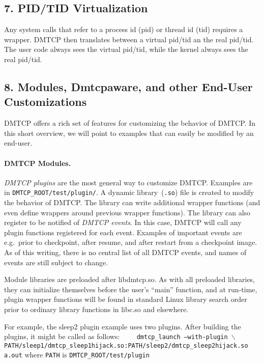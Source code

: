 \documentclass{article}
\begin{document}
\subsection*{7. PID/TID Virtualization}

Any system calls that refer to a process id (pid) or thread id (tid) requires
a wrapper.  DMTCP then translates between a virtual pid/tid an the
real pid/tid.  The user code always sees the virtual pid/tid, while
the kernel always sees the real pid/tid.

\newpage

\subsection*{8. Modules, Dmtcpaware, and other End-User Customizations}

DMTCP offers a rich set of features for customizing the behavior of
DMTCP.  In this short overview, we will point to examples that can
easily be modified by an end-user.

\paragraph{DMTCP Modules.}

{\em DMTCP plugins\/} are the most general way to customize DMTCP.  Examples
are in {\tt DMTCP\_ROOT/test/plugin/}.  A dynamic library~({\tt *.so})
file is created to modify the behavior of DMTCP.  The library can
write additional wrapper functions (and even define wrappers around
previous wrapper functions).  The library can also register
to be notified of {\em DMTCP events}.  In this case, DMTCP will
call any plugin functions registered for each event.
Examples of important events are
\hbox{e.g.}~prior to checkpoint, after resume, and after restart
from a checkpoint image.  As of this writing, there is no central
list of all DMTCP events, and names of events are still subject to change.

Module libraries are preloaded after libdmtcp.so.  As with all
preloaded libraries, they can initialize themselves before the user's
``main'' function, and at run-time, plugin wrapper functions will
be found in standard Linux library search order prior to ordinary
library functions in libc.so and elsewhere.

For example, the sleep2 plugin example uses two plugins.  After building
the plugins, it might be called as follows: \newline
{\tt
\hbox{\ \ }  dmtcp\_launch --with-plugin $\backslash$ \newline
\hbox{\ \ \ \ }
 PATH/sleep1/dmtcp\_sleep1hijack.so:PATH/sleep2/dmtcp\_sleep2hijack.so a.out}
 \newline
where {\tt PATH} is {\tt DMTCP\_ROOT/test/plugin}
\end{document}
